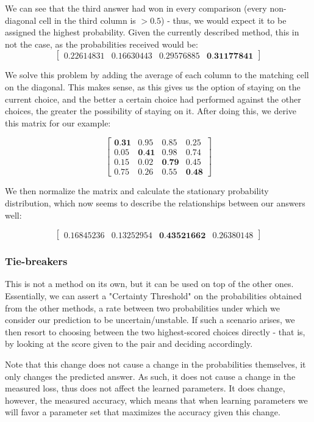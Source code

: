 \documentclass{article}
\begin{document}
We can see that the third answer had won in every comparison (every non-diagonal cell in the third column is $>0.5$) - thus, we would expect it to be assigned the highest probability. Given the currently described method, this in not the case, as the probabilities received would be:
$$ \begin{bmatrix} 0.22614831 & 0.16630443 & 0.29576885 & \textbf{0.31177841} \end{bmatrix} $$

We solve this problem by adding the average of each column to the matching cell on the diagonal. This makes sense, as this gives us the option of staying on the current choice, and the better a certain choice had performed against the other choices, the greater the possibility of staying on it.
After doing this, we derive this matrix for our example:

$$
\begin{bmatrix}
\textbf{0.31} & 0.95 & 0.85 & 0.25 \\
0.05 & \textbf{0.41} & 0.98 & 0.74 \\
0.15 & 0.02 & \textbf{0.79} & 0.45 \\
0.75 & 0.26 & 0.55 & \textbf{0.48}
\end{bmatrix}
$$

We then normalize the matrix and calculate the stationary probability distribution, which now seems to describe the relationships between our answers well:

$$ \begin{bmatrix} 0.16845236 & 0.13252954 & \textbf{0.43521662} & 0.26380148 \end{bmatrix} $$

\subsubsection{Tie-breakers}

This is not a method on its own, but it can be used on top of the other ones.
Essentially, we can assert a "Certainty Threshold" on the probabilities obtained from the other methods, a rate between two probabilities under which we consider our prediction to be uncertain/unstable.
If such a scenario arises, we then resort to choosing between the two highest-scored choices directly - that is, by looking at the score given to the pair and deciding accordingly.

Note that this change does not cause a change in the probabilities themselves, it only changes the predicted answer. As such, it does not cause a change in the measured loss, thus does not affect the learned parameters. It does change, however, the measured accuracy, which means that when learning parameters we will favor a parameter set that maximizes the accuracy given this change.
\end{document}
